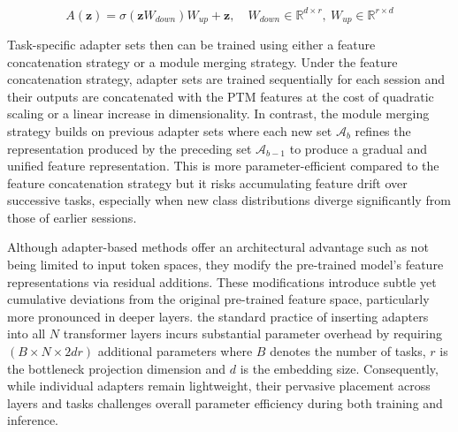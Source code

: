 \begin{equation}
    A(\mathbf{z}) = \sigma(\mathbf{z}W_{down})W_{up} + \mathbf{z}, \quad W_{down} \in \mathbb{R}^{d \times r}, \ W_{up} \in \mathbb{R}^{r \times d}
    \label{eq:adapter}
\end{equation}

Task-specific adapter sets then can be trained using either a feature concatenation strategy or a module merging strategy. Under the feature concatenation strategy, adapter sets are trained sequentially for each session and their outputs are concatenated with the PTM features at the cost of quadratic scaling or a linear increase in dimensionality. In contrast, the module merging strategy builds on previous adapter sets where each new set $\mathcal{A}_b$ refines the representation produced by the preceding set $\mathcal{A}_{b-1}$ to produce a gradual and unified feature representation. This is more parameter-efficient compared to the feature concatenation strategy but it risks accumulating feature drift over successive tasks, especially when new class distributions diverge significantly from those of earlier sessions.


Although adapter-based methods offer an architectural advantage such as not being limited to input token spaces, they modify the pre-trained model’s feature representations via residual additions. These modifications introduce subtle yet cumulative deviations from the original pre-trained feature space, particularly more pronounced in deeper layers. the standard practice of inserting adapters into all $N$ transformer layers incurs substantial parameter overhead by requiring $(B \times N \times 2dr)$ additional parameters where $B$ denotes the number of tasks, $r$ is the bottleneck projection dimension and $d$ is the embedding size.
Consequently, while individual adapters remain lightweight, their pervasive placement across layers and tasks challenges overall parameter efficiency during both training and inference.